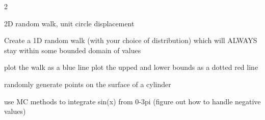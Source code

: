 \documentclass[12pt]{article}%
\begin{document}
\begin{multicols*}{2}



\begin{Exercise}[origin={10 points, Python}]

2D random walk, unit circle displacement

\end{Exercise}


\begin{Exercise}[origin={10 points, Python}]

Create a 1D random walk (with your choice of distribution) which will ALWAYS stay within some bounded domain of values

plot the walk as a blue line
plot the upped and lower bounds as a dotted red line

\end{Exercise}


\begin{Exercise}[origin={10 points, Python}]

randomly generate points on the surface of a cylinder

\end{Exercise}

\begin{Exercise}[origin={10 points, Python}]

use MC methods to integrate sin(x) from 0-3pi (figure out how to handle negative values)

\end{Exercise}



\vfill\null


\end{multicols*}
\end{document}
